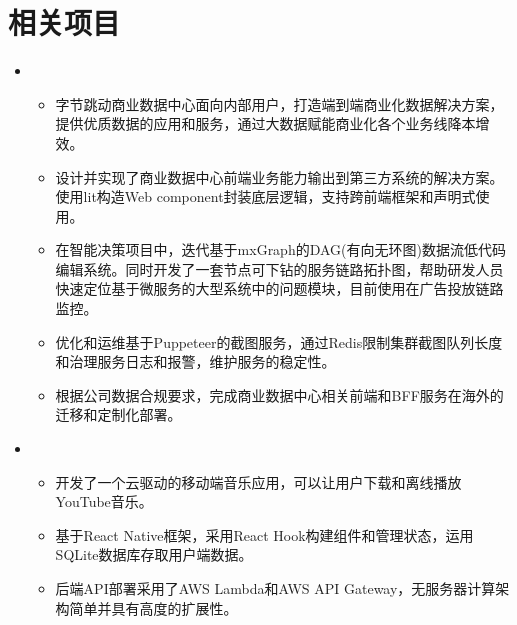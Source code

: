 \documentclass[11pt,a4paper,sans]{moderncv}        %
\begin{document}
\section{相关项目}
\vspace{2pt}
\begin{itemize}

\item{

\begin{itemize}
\item{字节跳动商业数据中心面向内部用户，打造端到端商业化数据解决方案，提供优质数据的应用和服务，通过大数据赋能商业化各个业务线降本增效。}
\vspace{2pt}
\item{设计并实现了商业数据中心前端业务能力输出到第三方系统的解决方案。使用lit构造Web component封装底层逻辑，支持跨前端框架和声明式使用。}
\vspace{2pt}
\item{在智能决策项目中，迭代基于mxGraph的DAG(有向无环图)数据流低代码编辑系统。同时开发了一套节点可下钻的服务链路拓扑图，帮助研发人员快速定位基于微服务的大型系统中的问题模块，目前使用在广告投放链路监控。}
\vspace{2pt}
\item{优化和运维基于Puppeteer的截图服务，通过Redis限制集群截图队列长度和治理服务日志和报警，维护服务的稳定性。}
\vspace{2pt}
\item{根据公司数据合规要求，完成商业数据中心相关前端和BFF服务在海外的迁移和定制化部署。}
\end{itemize}}


\vspace{1em}


\item{

\begin{itemize}
\item{开发了一个云驱动的移动端音乐应用，可以让用户下载和离线播放YouTube音乐。}
\vspace{2pt}
\item{基于React Native框架，采用React Hook构建组件和管理状态，运用SQLite数据库存取用户端数据。}
\vspace{2pt}
\item{后端API部署采用了AWS Lambda和AWS API Gateway，无服务器计算架构简单并具有高度的扩展性。}
\end{itemize}}



\end{itemize}
\end{document}
